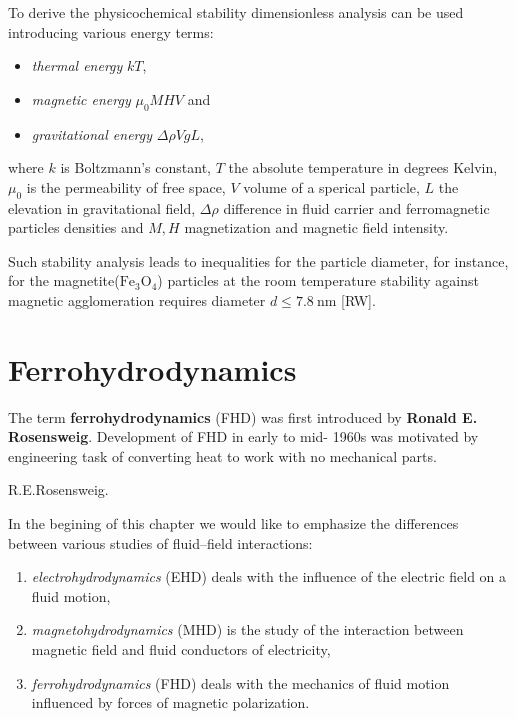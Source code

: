 \par To derive the physicochemical stability dimensionless analysis can be used introducing various energy terms:

\begin{itemize}
\item \textit{thermal energy} $kT$,
\item \textit{magnetic energy} $\mu_0 M H V$ and
\item \textit{gravitational energy} $\Delta \rho V g L$,
\end{itemize}

where $k$ is Boltzmann's constant, $T$ the absolute temperature in degrees Kelvin, $\mu_0$ is the permeability of free space, $V$ volume of a sperical particle, $L$ the elevation in gravitational field, $\Delta \rho$ difference in fluid carrier and ferromagnetic particles densities and $M, H$ magnetization and magnetic field intensity.

\par Such stability analysis leads to inequalities for  the particle diameter, for instance, for the magnetite($\mathrm{Fe}_3 \mathrm{O}_4$)  particles at the room temperature stability against magnetic agglomeration requires diameter $d \leq 7.8 ~ \si{\nano\metre}$ [RW]. 

\section{Ferrohydrodynamics}

\par The term \textbf{ferrohydrodynamics} (FHD) was first introduced by \textbf{Ronald E. Rosensweig}. Development of FHD in early to mid- 1960s was motivated by engineering task of converting heat to work with no mechanical parts. 

 R.E.Rosensweig. 

\par In the begining of this chapter we would like to emphasize the differences between various studies of fluid--field interactions: 

\begin{enumerate}
\item \emph{electrohydrodynamics} (EHD) deals with the influence of the electric field on a fluid motion,
\item \emph{magnetohydrodynamics} (MHD) is the study of the interaction between magnetic field and fluid conductors of electricity,
\item \emph{ferrohydrodynamics} (FHD) deals with the mechanics of fluid motion influenced by forces of magnetic polarization.
\end{enumerate}

